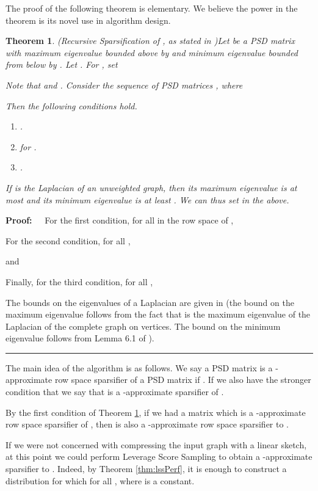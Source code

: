 \documentclass[11pt]{article}
\newtheorem{theorem}{Theorem}
\newenvironment{proof}{\begin{trivlist} \item {\bf Proof:~~}}
  {\qed\end{trivlist}}
\def\qed{\hfill\rule{2mm}{2mm}}
\begin{document}
The proof of the following
theorem is elementary. We believe the power in the theorem is its novel
use in algorithm design. 

\begin{theorem}(Recursive Sparsification of \cite{lmp13}, as stated in \cite{KLMMS14})\label{thm:mp}
Let  be a PSD matrix with maximum eigenvalue bounded above by  and minimum eigenvalue bounded from
below by . Let . For , set

Note that  and . Consider the sequence of PSD matrices
, where

Then the following conditions hold.
\begin{enumerate}
\item .
\item  for . 
\item .
\end{enumerate}
If  is the Laplacian of an unweighted graph, then its maximum eigenvalue is at most  and its minimum
eigenvalue is at least . We can thus set 
in the above. 
\end{theorem}
\begin{proof}
For the first condition, for all  in the row space of , 

For the second condition, for all ,

and

Finally, for the third condition, for all ,
 
The bounds on the eigenvalues of a Laplacian are given in \cite{st04} (the bound on the maximum eigenvalue follows from
the fact that  is the maximum eigenvalue of the Laplacian of the complete graph on  vertices. The bound on the minimum
eigenvalue follows from Lemma 6.1 of \cite{st04}). 
\end{proof}
The main idea of the algorithm is as follows. We say a PSD matrix  is a -approximate 
row space sparsifier of a PSD matrix  if . If we also
have the stronger condition that  we say that 
is a -approximate sparsifier of . 

By the first condition of Theorem \ref{thm:mp}, if we had a matrix  which is a -approximate
row space sparsifier of , then  is also a -approximate row space sparsifier to . 

If we were not
concerned with compressing the input graph  with a linear sketch, at this point we could perform
Leverage Score Sampling to obtain a -approximate sparsifier to . Indeed, by 
Theorem \ref{thm:lssPerf}, it is enough to construct a distribution 
for which  for all , where  is a constant. 
\end{document}
